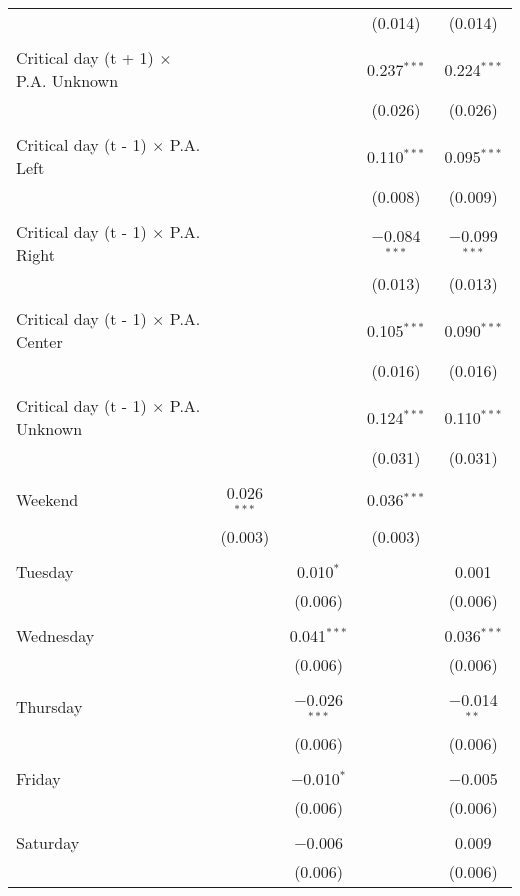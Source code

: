 \documentclass[
]{article}
\begin{document}
\begin{table}[!htbp]
{\begin{tabular}{@{\extracolsep{5pt}}lcccc}
  &  &  & (0.014) & (0.014) \\ 
  & & & & \\ 
 Critical day (t + 1) $\times$ P.A. Unknown &  &  & 0.237$^{***}$ & 0.224$^{***}$ \\ 
  &  &  & (0.026) & (0.026) \\ 
  & & & & \\ 
 Critical day (t - 1) $\times$ P.A. Left &  &  & 0.110$^{***}$ & 0.095$^{***}$ \\ 
  &  &  & (0.008) & (0.009) \\ 
  & & & & \\ 
 Critical day (t - 1) $\times$ P.A. Right &  &  & $-$0.084$^{***}$ & $-$0.099$^{***}$ \\ 
  &  &  & (0.013) & (0.013) \\ 
  & & & & \\ 
 Critical day (t - 1) $\times$ P.A. Center &  &  & 0.105$^{***}$ & 0.090$^{***}$ \\ 
  &  &  & (0.016) & (0.016) \\ 
  & & & & \\ 
 Critical day (t - 1) $\times$ P.A. Unknown &  &  & 0.124$^{***}$ & 0.110$^{***}$ \\ 
  &  &  & (0.031) & (0.031) \\ 
  & & & & \\ 
 Weekend & 0.026$^{***}$ &  & 0.036$^{***}$ &  \\ 
  & (0.003) &  & (0.003) &  \\ 
  & & & & \\ 
 Tuesday &  & 0.010$^{*}$ &  & 0.001 \\ 
  &  & (0.006) &  & (0.006) \\ 
  & & & & \\ 
 Wednesday &  & 0.041$^{***}$ &  & 0.036$^{***}$ \\ 
  &  & (0.006) &  & (0.006) \\ 
  & & & & \\ 
 Thursday &  & $-$0.026$^{***}$ &  & $-$0.014$^{**}$ \\ 
  &  & (0.006) &  & (0.006) \\ 
  & & & & \\ 
 Friday &  & $-$0.010$^{*}$ &  & $-$0.005 \\ 
  &  & (0.006) &  & (0.006) \\ 
  & & & & \\ 
 Saturday &  & $-$0.006 &  & 0.009 \\ 
  &  & (0.006) &  & (0.006) \\ 

\end{tabular}}
\end{table}
\end{document}

